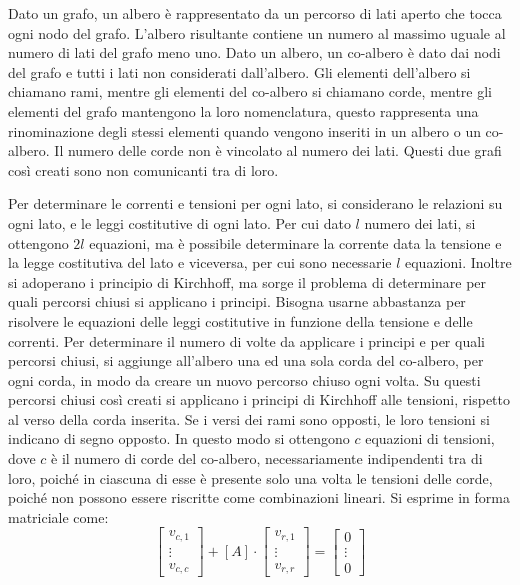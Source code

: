 \documentclass{article}
\numberwithin{equation}{subsection}
\begin{document}
Dato un grafo, un albero è rappresentato da un percorso di lati aperto che tocca ogni nodo del grafo. L'albero risultante contiene un numero al massimo uguale al numero di lati 
del grafo meno uno. Dato un albero, un co-albero è dato dai nodi del grafo e tutti i lati non considerati dall'albero. Gli elementi dell'albero si chiamano rami, mentre gli 
elementi del co-albero si chiamano corde, mentre gli elementi del grafo mantengono la loro nomenclatura, questo rappresenta una rinominazione degli stessi elementi quando 
vengono inseriti in un albero o un co-albero. Il numero delle corde non è vincolato al numero dei lati. Questi due grafi così creati sono non comunicanti tra di loro. 



Per determinare le correnti e tensioni per ogni lato, si considerano le relazioni su ogni lato, e le leggi costitutive di ogni lato. Per cui dato $l$ numero dei lati, si 
ottengono $2l$ equazioni, ma è possibile determinare la corrente data la tensione e la legge costitutiva del lato e viceversa, per cui sono necessarie $l$ equazioni. 
Inoltre si adoperano i principio di Kirchhoff, ma sorge il problema di determinare per quali percorsi chiusi si applicano i principi. Bisogna usarne abbastanza per risolvere le 
equazioni delle leggi costitutive in funzione della tensione e delle correnti. Per determinare il numero di volte da applicare i principi e per quali percorsi chiusi, si 
aggiunge all'albero una ed una sola corda del co-albero, per ogni corda, in modo da creare un nuovo percorso chiuso ogni volta. Su questi percorsi chiusi così creati si 
applicano i principi di Kirchhoff alle tensioni, rispetto al verso della corda inserita. Se i versi dei rami sono opposti, le loro tensioni si indicano di segno opposto. 
In questo modo si ottengono $c$ equazioni di tensioni, dove $c$ è il numero di corde del co-albero, necessariamente indipendenti tra di loro, poiché in ciascuna di esse è 
presente solo una volta le tensioni delle corde, poiché non possono essere riscritte come combinazioni lineari. Si esprime in forma matriciale come:
\begin{equation*}
    \begin{bmatrix}
        v_{c,1}\\
        \vdots\\
        v_{c,c}
    \end{bmatrix}+[A]\cdot\begin{bmatrix}
        v_{r,1}\\
        \vdots\\
        v_{r,r}
    \end{bmatrix}=
    \begin{bmatrix}
        0\\
        \vdots\\
        0
    \end{bmatrix}
\end{equation*}
\end{document}
